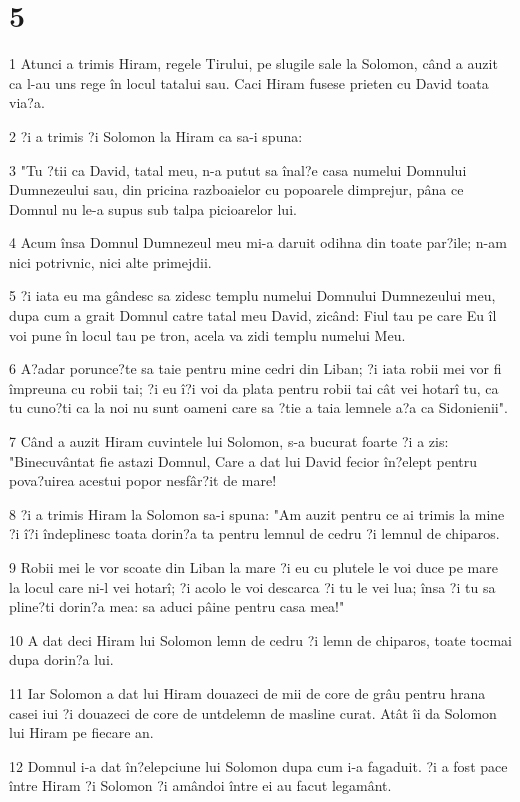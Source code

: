 \chapter{5}

\par 1 Atunci a trimis Hiram, regele Tirului, pe slugile sale la Solomon, când a auzit ca l-au uns rege în locul tatalui sau. Caci Hiram fusese prieten cu David toata via?a.
\par 2 ?i a trimis ?i Solomon la Hiram ca sa-i spuna:
\par 3 "Tu ?tii ca David, tatal meu, n-a putut sa înal?e casa numelui Domnului Dumnezeului sau, din pricina razboaielor cu popoarele dimprejur, pâna ce Domnul nu le-a supus sub talpa picioarelor lui.
\par 4 Acum însa Domnul Dumnezeul meu mi-a daruit odihna din toate par?ile; n-am nici potrivnic, nici alte primejdii.
\par 5 ?i iata eu ma gândesc sa zidesc templu numelui Domnului Dumnezeului meu, dupa cum a grait Domnul catre tatal meu David, zicând: Fiul tau pe care Eu îl voi pune în locul tau pe tron, acela va zidi templu numelui Meu.
\par 6 A?adar porunce?te sa taie pentru mine cedri din Liban; ?i iata robii mei vor fi împreuna cu robii tai; ?i eu î?i voi da plata pentru robii tai cât vei hotarî tu, ca tu cuno?ti ca la noi nu sunt oameni care sa ?tie a taia lemnele a?a ca Sidonienii".
\par 7 Când a auzit Hiram cuvintele lui Solomon, s-a bucurat foarte ?i a zis: "Binecuvântat fie astazi Domnul, Care a dat lui David fecior în?elept pentru pova?uirea acestui popor nesfâr?it de mare!
\par 8 ?i a trimis Hiram la Solomon sa-i spuna: "Am auzit pentru ce ai trimis la mine ?i î?i îndeplinesc toata dorin?a ta pentru lemnul de cedru ?i lemnul de chiparos.
\par 9 Robii mei le vor scoate din Liban la mare ?i eu cu plutele le voi duce pe mare la locul care ni-l vei hotarî; ?i acolo le voi descarca ?i tu le vei lua; însa ?i tu sa pline?ti dorin?a mea: sa aduci pâine pentru casa mea!"
\par 10 A dat deci Hiram lui Solomon lemn de cedru ?i lemn de chiparos, toate tocmai dupa dorin?a lui.
\par 11 Iar Solomon a dat lui Hiram douazeci de mii de core de grâu pentru hrana casei iui ?i douazeci de core de untdelemn de masline curat. Atât îi da Solomon lui Hiram pe fiecare an.
\par 12 Domnul i-a dat în?elepciune lui Solomon dupa cum i-a fagaduit. ?i a fost pace între Hiram ?i Solomon ?i amândoi între ei au facut legamânt.
